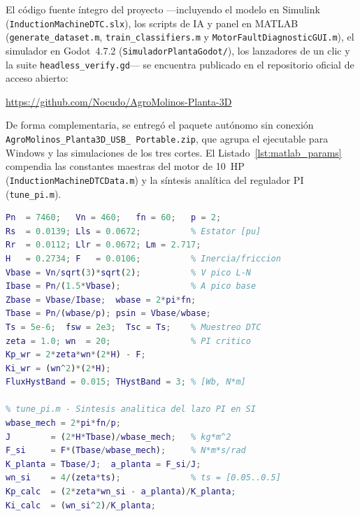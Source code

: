 El c\'odigo fuente \'integro del proyecto ---incluyendo el modelo en Simulink
(\texttt{Induction\allowbreak Machine\allowbreak DTC.slx}), los scripts de IA y panel en MATLAB
(\texttt{generate\_\allowbreak dataset.m}, \texttt{train\_\allowbreak classifiers.m} y
\texttt{Motor\allowbreak Fault\allowbreak Diagnostic\allowbreak GUI.m}), el simulador en Godot~4.7.2
(\texttt{Simulador\allowbreak Planta\allowbreak Godot/}), los lanzadores de un clic y la suite
\texttt{headless\_\allowbreak verify.gd}--- se encuentra publicado en el repositorio
oficial de acceso abierto:
\begin{center}
\url{https://github.com/Nocudo/AgroMolinos-Planta-3D}
\end{center}
De forma complementaria, se entreg\'o el paquete aut\'onomo sin conexi\'on
\texttt{AgroMolinos\_\allowbreak Planta3D\_\allowbreak USB\_\allowbreak
Portable.zip}, que agrupa el ejecutable para Windows y las simulaciones de los
tres cortes. El Listado~\ref{lst:matlab_params} compendia las constantes
maestras del motor de \qty{10}{HP} (\texttt{InductionMachineDTCData.m}) y la
s\'intesis anal\'itica del regulador PI (\texttt{tune\_pi.m}).

\begin{lstlisting}[language=Matlab,float=htbp,numbers=none,breaklines=true,xleftmargin=0pt,xrightmargin=0pt,caption={Constantes maestras de \texttt{InductionMachineDTCData.m} y s\'intesis PI de \texttt{tune\_pi.m} (motor \qty{10}{HP}, \qty{460}{\volt}, \qty{60}{\hertz}).},label={lst:matlab_params}]
% InductionMachineDTCData.m - Placa 10 HP, 460 V, 60 Hz
Pn  = 7460;   Vn = 460;   fn = 60;   p = 2;
Rs  = 0.0139; Lls = 0.0672;          % Estator [pu]
Rr  = 0.0112; Llr = 0.0672; Lm = 2.717;
H   = 0.2734; F   = 0.0106;          % Inercia/friccion
Vbase = Vn/sqrt(3)*sqrt(2);          % V pico L-N
Ibase = Pn/(1.5*Vbase);              % A pico base
Zbase = Vbase/Ibase;  wbase = 2*pi*fn;
Tbase = Pn/(wbase/p); psin = Vbase/wbase;
Ts = 5e-6;  fsw = 2e3;  Tsc = Ts;    % Muestreo DTC
zeta = 1.0; wn  = 20;                % PI critico
Kp_wr = 2*zeta*wn*(2*H) - F;
Ki_wr = (wn^2)*(2*H);
FluxHystBand = 0.015; THystBand = 3; % [Wb, N*m]

% tune_pi.m - Sintesis analitica del lazo PI en SI
wbase_mech = 2*pi*fn/p;
J        = (2*H*Tbase)/wbase_mech;   % kg*m^2
F_si     = F*(Tbase/wbase_mech);     % N*m*s/rad
K_planta = Tbase/J;  a_planta = F_si/J;
wn_si    = 4/(zeta*ts);              % ts = [0.05..0.5]
Kp_calc  = (2*zeta*wn_si - a_planta)/K_planta;
Ki_calc  = (wn_si^2)/K_planta;
\end{lstlisting}

